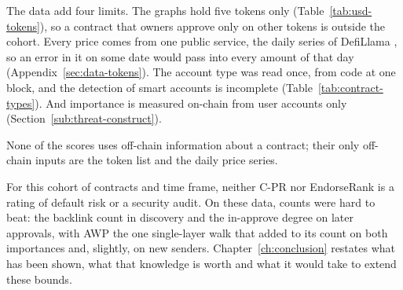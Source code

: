 The data add four limits. The graphs hold five tokens only (Table~\ref{tab:usd-tokens}), so a contract that owners approve only on other tokens is outside the cohort. Every price comes from one public service, the daily series of DefiLlama \parencite{defillamanddocs}, so an error in it on some date would pass into every amount of that day (Appendix~\ref{sec:data-tokens}). The account type was read once, from code at one block, and the detection of smart accounts is incomplete (Table~\ref{tab:contract-types}). And importance is measured on-chain from user accounts only (Section~\ref{sub:threat-construct}).

None of the scores uses off-chain information about a contract; their only off-chain inputs are the token list and the daily price series.

For this cohort of contracts and time frame, neither \mbox{C-PR} nor EndorseRank is a rating of default risk or a security audit. On these data, counts were hard to beat: the backlink count in discovery and the in-approve degree on later approvals, with AWP the one single-layer walk that added to its count on both importances and, slightly, on new senders. Chapter~\ref{ch:conclusion} restates what has been shown, what that knowledge is worth and what it would take to extend these bounds.
